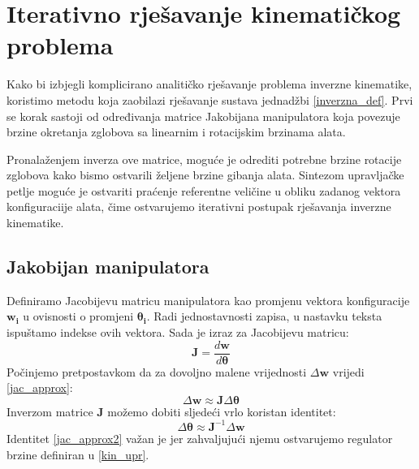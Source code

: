 \documentclass[times, utf8, diplomski, numeric]{fer}
\begin{document}
\section{Iterativno rješavanje kinematičkog problema}
Kako bi izbjegli komplicirano analitičko rješavanje problema inverzne kinematike, koristimo metodu koja zaobilazi rješavanje sustava jednadžbi \ref{inverzna_def}.
Prvi se korak sastoji od određivanja matrice Jakobijana manipulatora koja povezuje brzine okretanja zglobova sa linearnim i rotacijskim brzinama alata.

Pronalaženjem inverza ove matrice, moguće je odrediti potrebne brzine rotacije zglobova kako bismo ostvarili željene brzine gibanja alata.
Sintezom upravljačke petlje moguće je ostvariti praćenje referentne veličine u obliku zadanog vektora konfiguraciije alata, čime ostvarujemo iterativni postupak rješavanja inverzne kinematike.

\subsection{Jakobijan manipulatora}

Definiramo Jacobijevu matricu manipulatora kao promjenu vektora konfiguracije $\mathbf{w_i}$ u ovisnosti o promjeni $\bm{\theta}_{\mathbf{i}}$.
Radi jednostavnosti zapisa, u nastavku teksta ispuštamo indekse ovih vektora. Sada je izraz za Jacobijevu matricu:
\begin{equation}
\mathbf{J} =\frac{d\mathbf{w}}{d\bm{\theta}} \label{jakob}
\end{equation}
Počinjemo pretpostavkom da za dovoljno malene vrijednosti $\Delta \mathbf{w}$ vrijedi \ref{jac_approx}:
\begin{equation}
\Delta \mathbf{w} \approx \mathbf{J}  \Delta \bm{\theta}
\label{jac_approx}
\end{equation}
Inverzom matrice $\mathbf{J}$ možemo dobiti sljedeći vrlo koristan identitet:
\begin{equation}
\Delta \bm{\theta} \approx \mathbf{J}^{-1} \Delta \textbf{w}
\label{jac_approx2}
\end{equation}
Identitet \ref{jac_approx2} važan je jer zahvaljujući njemu ostvarujemo regulator brzine definiran u \ref{kin_upr}.
\end{document}
